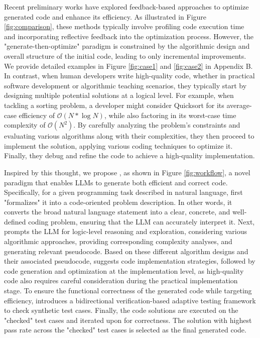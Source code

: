 Recent preliminary works \cite{EffiLearner,waghjale-etal-2024-ecco} have explored feedback-based approaches to optimize generated code and enhance its efficiency. As illustrated in Figure \ref{fig:comparison}, these methods typically involve profiling code execution time and incorporating reflective feedback into the optimization process. However, the "generate-then-optimize" paradigm is constrained by the algorithmic design and overall structure of the initial code, leading to only incremental improvements. We provide detailed examples in Figure \ref{fig:case1} and \ref{fig:case2} in Appendix B. In contrast, when human developers write high-quality code, whether in practical software development or algorithmic teaching scenarios, they typically start by designing multiple potential solutions at a logical level. For example, when tackling a sorting problem, a developer might consider Quicksort for its average-case efficiency of $\mathcal{O}(N*\log N)$, while also factoring in its worst-case time complexity of $\mathcal{O}(N^2)$. By carefully analyzing the problem’s constraints and evaluating various algorithms along with their complexities, they then proceed to implement the solution, applying various coding techniques to optimize it. Finally, they debug and refine the code to achieve a high-quality implementation.

Inspired by this thought, we propose \tool, as shown in Figure \ref{fig:workflow}, a novel paradigm that enables LLMs to generate both efficient and correct code. Specifically, for a given programming task described in natural language, \tool first "formalizes" it into a code-oriented problem description. In other words, it converts the broad natural language statement into a clear, concrete, and well-defined coding problem, ensuring that the LLM can accurately interpret it. Next, \tool prompts the LLM for logic-level reasoning and exploration, considering various algorithmic approaches, providing corresponding complexity analyses, and generating relevant pseudocode. Based on these different algorithm designs and their associated pseudocode, \tool suggests code implementation strategies, followed by code generation and optimization at the implementation level, as high-quality code also requires careful consideration during the practical implementation stage. To ensure the functional correctness of the generated code while targeting efficiency, \tool introduces a bidirectional verification-based adaptive testing framework to check synthetic test cases. Finally, the code solutions are executed on the "checked" test cases and iterated upon for correctness. The solution with highest pass rate across the "checked" test cases is selected as the final generated code.

